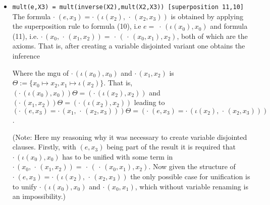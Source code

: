 \documentclass[11pt,a4paper]{article}
\begin{document}
\begin{itemize}
\item \texttt{mult(e,X3) = mult(inverse(X2),mult(X2,X3)) [superposition 11,10]}\\
The formula $\cdot \; (e, x_3) = \cdot \, (\iota(x_2), \,\cdot\,(x_2 , x_3))$ is obtained by applying the superposition rule to formula (10), i.e $e =\;\cdot\,(\iota(x_0), x_0)$ and formula (11), i.e. $\cdot\, (x_0 , \,\cdot\, (x_1 , x_2)) = \,\cdot\, (\,\cdot\, (x_0 , x_1), x_2)$, both of which are the axioms. That is, after creating a variable disjointed variant one obtains the inference
\begin{prooftree}
\end{prooftree}

Where the mgu of $\cdot\,(\iota(x_0), x_0)$ and $\cdot\, (x_1 , x_2)$ is $\Theta := \{x_0 \mapsto x_2, x_1 \mapsto \iota(x_2)\}$.
That is, $(\cdot\,(\iota(x_0), x_0))\Theta = (\cdot\,(\iota(x_2), x_2))$ and $(\cdot\, (x_1 , x_2))\Theta = (\cdot\, (\iota(x_2) , x_2))$ leading to $(\cdot \; (e, x_3) = \cdot \, (x_1, \,\cdot\,(x_2 , x_3)))\Theta = (\cdot \; (e, x_3) = \cdot \, (\iota(x_2), \,\cdot\,(x_2 , x_3)))$.

(Note: Here my reasoning why it was necessary to create variable disjointed clauses. Firstly, with $(e, x_3)$ being part of the result it is required that $\cdot\,(\iota(x_0), x_0)$ has to be unified with some term in $\cdot\, (x_0 , \,\cdot\, (x_1 , x_2)) = \,\cdot\, (\,\cdot\, (x_0 , x_1), x_2)$.  Now given the structure  of $\cdot \; (e, x_3) = \cdot \, (\iota(x_2), \,\cdot\,(x_2 , x_3))$ the only possible case for unification is to unify $\cdot\,(\iota(x_0), x_0)$ and $\cdot\, (x_0 , x_1)$, which without variable renaming is an impossibility.)




\end{itemize}
\end{document}
